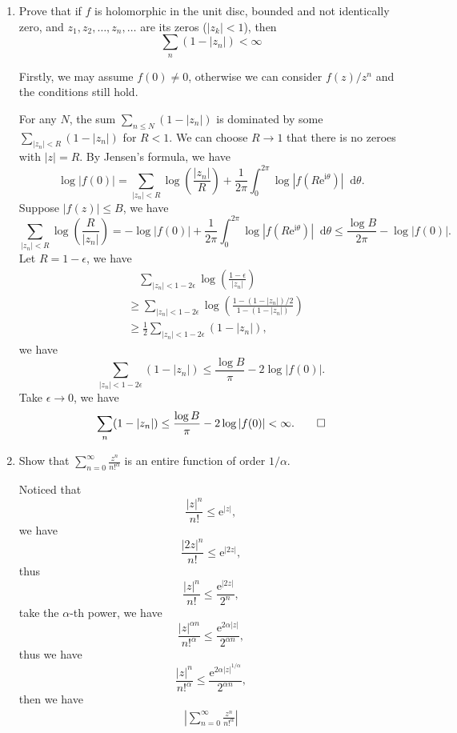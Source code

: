 \documentclass[11pt]{report}
\theoremstyle{mythm}
\let\oldendproof\endproof
\renewenvironment{proof}[1][\proofname]{%
  \oldproof[\normalfont \bfseries #1]%
}{\oldendproof}
\renewcommand*{\proofname}{Proof}
\theoremstyle{myans}
\newcommand{\mi}{\mathrm{i}}
\newcommand{\me}{\mathrm{e}}
\newcommand{\dd}{\mathop{}\!\mathrm{d}}
\begin{document}
\begin{enumerate}
  \item Prove that if $f$ is holomorphic in the unit disc, bounded and not identically
  zero, and $z_1,z_2,\dots,z_n,\dots$ are its zeros ($|z_k| < 1$), then
  \[ \sum_n (1 - |z_n|) < \infty \]
  \begin{proof}
    Firstly, we may assume $f(0)\neq 0$, otherwise we can consider $f(z)/z^n$ and the conditions still
    hold.

    For any $N$, the sum $\sum_{n\leq N} (1 - |z_n|)$ is dominated by some $\sum_{|z_n| < R}(1-|z_n|)$
    for $R < 1$. We can choose $R\to 1$ that there is no zeroes with $|z|=R$. By Jensen's formula, we have
    \[ \log |f(0)| = \sum_{|z_n| < R} \log\left(\frac{|z_n|}{R}\right) +
    \frac 1{2\pi} \int_0^{2\pi} \log |f(R\me^{\mi \theta})| \dd \theta. \]
    Suppose $|f(z)|\leq B$, we have
    \[ \sum_{|z_n| < R} \log\left(\frac{R}{|z_n|}\right)
    = -\log |f(0)| + \frac{1}{2\pi} \int_0^{2\pi} \log |f(R\me^{\mi \theta})|\dd \theta
    \leq \frac{\log B}{2\pi} - \log |f(0)|. \]
    Let $R = 1-\epsilon$, we have
    \begin{align*}
      &\quad \sum_{|z_n| < 1-2\epsilon} \log \left(\frac{1-\epsilon}{|z_n|}\right)\\
      &\geq \sum_{|z_n| < 1-2\epsilon} \log \left(\frac{1-(1-|z_n|)/2}{1-(1-|z_n|)}\right)\\
      &\geq \frac 12\sum_{|z_n| < 1-2\epsilon} (1-|z_n|),
    \end{align*}
    we have
    \[ \sum_{|z_n| < 1-2\epsilon} (1-|z_n|) \leq \frac{\log B}{\pi} - 2\log |f(0)|. \]
    Take $\epsilon \to 0$, we have
    \[ \sum_n (1-|z_n|) \leq \frac{\log B}{\pi} - 2\log |f(0)| < \infty. \qedhere \]
  \end{proof}
  \setcounter{enumi}{2}
  \item Show that $\displaystyle \sum_{n=0}^{\infty} \frac{z^n}{n!^\alpha}$ is an entire function of order $1/\alpha$.
  \begin{proof}
    Noticed that
    \[ \frac{|z|^n}{n!} \leq \me^{|z|}, \]
    we have
    \[ \frac{|2z|^n}{n!} \leq \me^{|2z|}, \]
    thus
    \[ \frac{|z|^n}{n!} \leq \frac{\me^{|2z|}}{2^n}, \]
    take the $\alpha$-th power, we have
    \[ \frac{|z|^{\alpha n}}{n!^{\alpha}} \leq \frac{\me^{2\alpha |z|}}{2^{\alpha n}}, \]
    thus we have
    \[ \frac{|z|^{n}}{n!^{\alpha}} \leq \frac{\me^{2\alpha |z|^{1/\alpha}}}{2^{\alpha n}}, \]
    then we have
    \begin{align*}
      \left|\sum_{n=0}^{\infty} \frac{z^n}{n!^\alpha}\right|

\end{align*}
\end{proof}
\end{enumerate}
\end{document}

